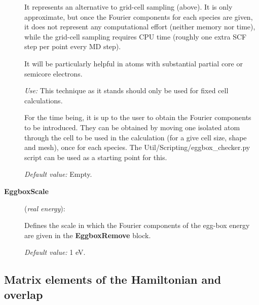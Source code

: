 \begin{description}
It represents an alternative to grid-cell sampling (above).
It is only approximate, but once the Fourier components for each
species are given, it does not represent any computational
effort (neither memory nor time), while the grid-cell sampling
requires CPU time (roughly one extra SCF step per point every
MD step).

It will be particularly helpful in atoms with substantial partial
core or semicore electrons.

\textit{Use:} This technique as it stands should only be used for fixed cell
calculations.

For the time being, it is up to the user to obtain the Fourier
components to be introduced. They can be obtained by moving one
isolated atom through the cell to be used in the calculation
(for a give cell size, shape and mesh), once for each species.
The Util/Scripting/eggbox\_checker.py script can be used as a starting
point for this.

\textit{Default value:} Empty.


\item[\textbf{EggboxScale}] (\textit{real energy}):

Defines the scale in which the Fourier components of the
egg-box energy are given in the \textbf{EggboxRemove} block.

\textit{Default value:} 1 eV.

\end{description}

\subsection{Matrix elements of the Hamiltonian and overlap}

